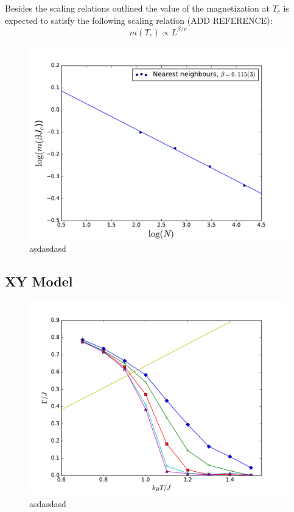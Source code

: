 \documentclass[twoside]{article}
\begin{document}
\begin{multicols}{2}
Besides the scaling relations outlined the value of the magnetization at $T_c$ is expected to satisfy the following scaling relation (ADD REFERENCE):
\begin{equation}
m(T_c) \propto L^{\beta/\nu}
\end{equation}

\begin{figure}[H]
\centering
\includegraphics[scale=0.4]{images/plot_magnetization.pdf}
\caption{asdasdasd}
\end{figure}

\subsection{XY Model}

\begin{figure}[H]
\centering
\includegraphics[scale=0.4]{images/helicity_modulus.pdf}
\caption{asdasdasd}
\end{figure}


\end{multicols}
\end{document}
